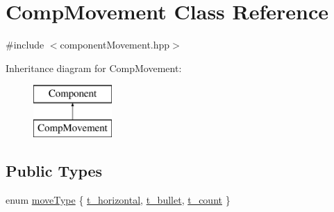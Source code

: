 \hypertarget{class_comp_movement}{\section{Comp\-Movement Class Reference}
\label{class_comp_movement}
}


{\ttfamily \#include $<$component\-Movement.\-hpp$>$}

Inheritance diagram for Comp\-Movement\-:\begin{figure}[H]
\begin{center}
\leavevmode
\includegraphics[height=2.000000cm]{class_comp_movement}
\end{center}
\end{figure}
\subsection*{Public Types}
\begin{DoxyCompactItemize}
\item 
enum \hyperlink{class_comp_movement_a5be67228360a37b9032bd70d44856c83}{move\-Type} \{ \hyperlink{class_comp_movement_a5be67228360a37b9032bd70d44856c83a1cd5577a817502a6c18ee1ee928da3d8}{t\-\_\-horizontal}, 
\hyperlink{class_comp_movement_a5be67228360a37b9032bd70d44856c83afca205ba3717252b8b426a3f3ac5f63c}{t\-\_\-bullet}, 
\hyperlink{class_comp_movement_a5be67228360a37b9032bd70d44856c83a6bf36969f9174e7f135d45c16d57f0da}{t\-\_\-count}
 \}
\end{DoxyCompactItemize}
